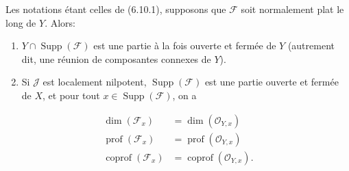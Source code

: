 \begin{proposition}[6.10.3]
\label{IV.2.s6.10.3-fr}
Les notations étant celles de (6.10.1), supposons que $\mathcal F$ soit
normalement plat le long de $Y$. Alors:
\begin{enumerate}
\item[(i)] $Y\cap\operatorname{Supp}(\mathcal F)$ est une partie à la fois
ouverte et fermée de $Y$ (autrement dit, une réunion de composantes connexes
de $Y$).
\item[(ii)] Si $\mathcal J$ est localement nilpotent,
$\operatorname{Supp}(\mathcal F)$ est une partie ouverte et fermée de $X$, et
pour tout $x\in\operatorname{Supp}(\mathcal F)$, on a
\end{enumerate}
\begin{align}
\dim(\mathcal F_x)&=\dim(\mathcal O_{Y,x})
  \tag{6.10.3.1}\label{IV.2.s6.10.3.1-fr}\\
\operatorname{prof}(\mathcal F_x)&=\operatorname{prof}(\mathcal O_{Y,x})
  \tag{6.10.3.2}\label{IV.2.s6.10.3.2-fr}\\
\operatorname{coprof}(\mathcal F_x)&=\operatorname{coprof}(\mathcal O_{Y,x}).
  \tag{6.10.3.3}\label{IV.2.s6.10.3.3-fr}
\end{align}
\end{proposition}

